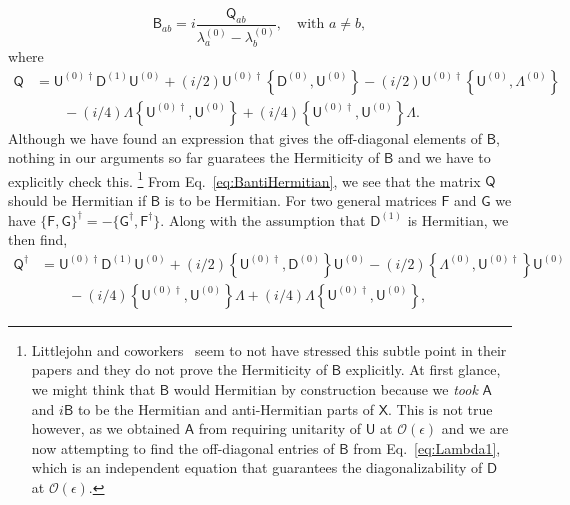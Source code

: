 %
\begin{equation}
  \mathsf{B}_{ab} = i\frac{\mathsf{Q}_{ab}}{\lambda^{(0)}_{a} - \lambda^{(0)}_{b}},
  \quad \text{with }a \neq b,
  \label{eq:BantiHermitian}
\end{equation}
%
where
%
\begin{equation}
  \begin{aligned}
    \mathsf{Q} &= \mathsf{U}^{(0)\dagger}\mathsf{D}^{(1)}\mathsf{U}^{(0)} + (i/2)\mathsf{U}^{(0)\dagger}\left\{\mathsf{D}^{(0)},\mathsf{U}^{(0)}\right\} - (i/2)\mathsf{U}^{(0)\dagger}\left\{\mathsf{U}^{(0)},\Lambda^{(0)}\right\}\\
               &\phantom{}\qquad -(i/4)\Lambda\left\{\mathsf{U}^{(0)\dagger}, \mathsf{U}^{(0)}\right\} +
  (i/4)\left\{\mathsf{U}^{(0)\dagger}, \mathsf{U}^{(0)}\right\}\Lambda.
  \end{aligned}
\end{equation}
%
Although we have found an expression that gives the off-diagonal elements of $\mathsf{B}$, nothing in our arguments so far guaratees the Hermiticity of $\mathsf{B}$ and we have to explicitly check this.%
\footnote{Littlejohn and coworkers~\cite{littlejohn1991,weigert1993} seem to not have stressed this subtle point in their papers and they do not prove the Hermiticity of $\mathsf{B}$ explicitly.
  At first glance, we might think that $\mathsf{B}$ would Hermitian by construction because we \emph{took} $\mathsf{\mathsf{A}}$ and $i\mathsf{B}$ to be the Hermitian and anti-Hermitian parts of $\mathsf{X}$.
  This is not true however, as we obtained $\mathsf{A}$ from requiring unitarity of $\mathsf{U}$ at $\mathcal{O}(\epsilon)$ and we are now attempting to find the off-diagonal entries of $\mathsf{B}$ from Eq.~\eqref{eq:Lambda1}, which is an independent equation that guarantees the diagonalizability of $\mathsf{D}$ at $\mathcal{O}(\epsilon)$.
}
From Eq.~\eqref{eq:BantiHermitian}, we see that the matrix $\mathsf{Q}$ should be Hermitian if $\mathsf{B}$ is to be Hermitian.
For two general matrices $\mathsf{F}$ and $\mathsf{G}$ we have $\{\mathsf{F},\mathsf{G}\}^{\dagger} = -\{\mathsf{G}^{\dagger},\mathsf{F}^{\dagger}\}$.
Along with the assumption that $\mathsf{D}^{(1)}$ is Hermitian, we then find,
%
\begin{equation}
  \begin{aligned}
    \mathsf{Q}^{\dagger} &=  \mathsf{U}^{(0)\dagger}\mathsf{D}^{(1)}\mathsf{U}^{(0)} + (i/2)\left\{\mathsf{U}^{(0)\dagger},   \mathsf{D}^{(0)}\right\}\mathsf{U}^{(0)} - (i/2)\left\{\Lambda^{(0)}, \mathsf{U}^{(0)\dagger}\right\}\mathsf{U}^{(0)}\\
                         &\phantom{}\qquad - (i/4)\left\{\mathsf{U}^{(0)\dagger}, \mathsf{U}^{(0)}\right\}\Lambda
  + (i/4)\Lambda\left\{\mathsf{U}^{(0)\dagger}, \mathsf{U}^{(0)}\right\},
  \end{aligned}
  \label{eq:Qmat}
\end{equation}
